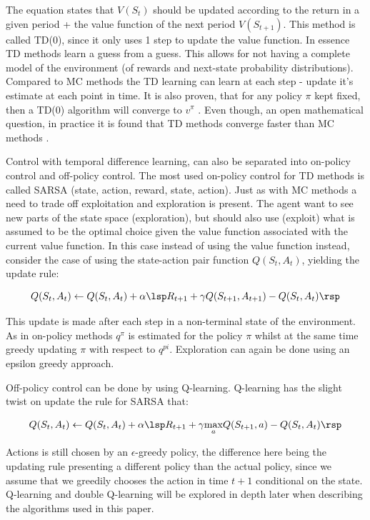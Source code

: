 The equation states that $V(S_t)$ should be updated according to the return in a given period + the value function of the next period $V(S_{t+1})$. This method is called TD(0), since it only uses 1 step to update the value function. In essence TD methods learn a guess from a guess. This allows for not having a complete model of the environment (of rewards and next-state probability distributions). Compared to MC methods the TD learning can learn at each step - update it's estimate at each point in time. It is also proven, that for any policy $\pi$ kept fixed, then a TD(0) algorithm will converge to $v^{\pi}$ \parencite{sutton_reinforcement_2018}. Even though, an open mathematical question, in practice it is found that TD methods converge faster than MC methods \parencite{sutton_reinforcement_2018}.

Control with temporal difference learning, can also be separated into on-policy control and off-policy control. The most used on-policy control for TD methods is called SARSA (state, action, reward, state, action). Just as with MC methods a need to trade off exploitation and exploration is present. The agent want to see new parts of the state space (exploration), but should also use (exploit) what is assumed to be the optimal choice given the value function associated with the current value function. In this case instead of using the value function instead, consider the case of using the state-action pair function $Q(S_t, A_t)$, yielding the update rule:

\begin{equation}
    Q(S_t, A_t) \leftarrow Q(S_t, A_t) + \alpha \lsp R_{t+1} + \gamma Q(S_{t+1}, A_{t+1}) - Q(S_t, A_t) \rsp
\end{equation}

This update is made after each step in a non-terminal state of the environment. As in on-policy methods $q^{\pi}$ is estimated for the policy $\pi$ whilst at the same time greedy updating $\pi$ with respect to $q^{pi}$. Exploration can again be done using an epsilon greedy approach.

Off-policy control can be done by using Q-learning. Q-learning has the slight twist on update the rule for SARSA that:

\begin{equation}
    Q(S_t, A_t) \leftarrow Q(S_t, A_t) + \alpha \lsp R_{t+1} + \gamma \underset{a}{\max} Q(S_{t + 1}, a) - Q(S_t, A_t) \rsp 
\end{equation}

Actions is still chosen by an $\epsilon$-greedy policy, the difference here being the updating rule presenting a different policy than the actual policy, since we assume that we greedily chooses the action in time $t+1$ conditional on the state. Q-learning and double Q-learning will be explored in depth later when describing the algorithms used in this paper.

